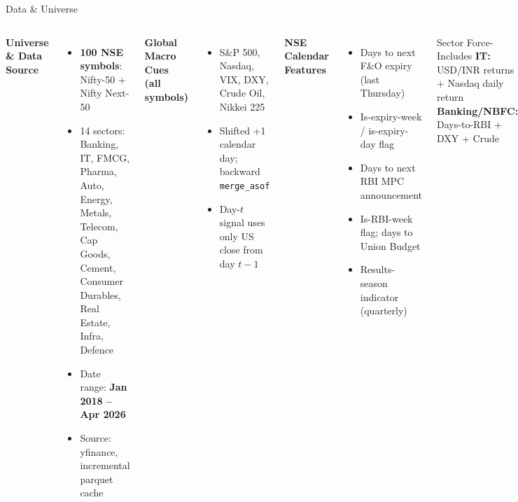 \documentclass[10pt,aspectratio=43]{beamer}
\newcommand{\hl}[1]{\textcolor{primary}{\textbf{#1}}}
\newcommand{\gd}[1]{\textcolor{secondary}{\textbf{#1}}}
\newcommand{\vsep}{\vspace{0.04cm}}
\begin{document}
\begin{frame}{Data \& Universe}
  \begin{columns}[T]
      \gd{\textbf{Universe \& Data Source}}
      \vsep
      \begin{itemize}\itemsep3pt
        \item \hl{100 NSE symbols}: Nifty-50 + Nifty Next-50
        \item 14 sectors: Banking, IT, FMCG, Pharma, Auto, Energy, Metals, Telecom, Cap Goods, Cement, Consumer Durables, Real Estate, Infra, Defence
        \item Date range: \textbf{Jan 2018 -- Apr 2026}
        \item Source: yfinance, incremental parquet cache
      \end{itemize}
      \vsep
      \gd{\textbf{Global Macro Cues (all symbols)}}
      \vsep
      \begin{itemize}\itemsep3pt
        \item S\&P 500, Nasdaq, VIX, DXY, Crude Oil, Nikkei 225
        \item Shifted +1 calendar day; backward \texttt{merge\_asof}
        \item Day-$t$ signal uses only US close from day $t-1$
      \end{itemize}
      \gd{\textbf{NSE Calendar Features}}
      \vsep
      \begin{itemize}\itemsep3pt
        \item Days to next F\&O expiry (last Thursday)
        \item Is-expiry-week / is-expiry-day flag
        \item Days to next RBI MPC announcement
        \item Is-RBI-week flag; days to Union Budget
        \item Results-season indicator (quarterly)
      \end{itemize}
      \vsep
      \begin{exampleblock}{Sector Force-Includes}
        \small
        \textbf{IT:} USD/INR returns + Nasdaq daily return\\[2pt]
        \textbf{Banking/NBFC:} Days-to-RBI + DXY + Crude
      \end{exampleblock}
  \end{columns}
\end{frame}
\end{document}
